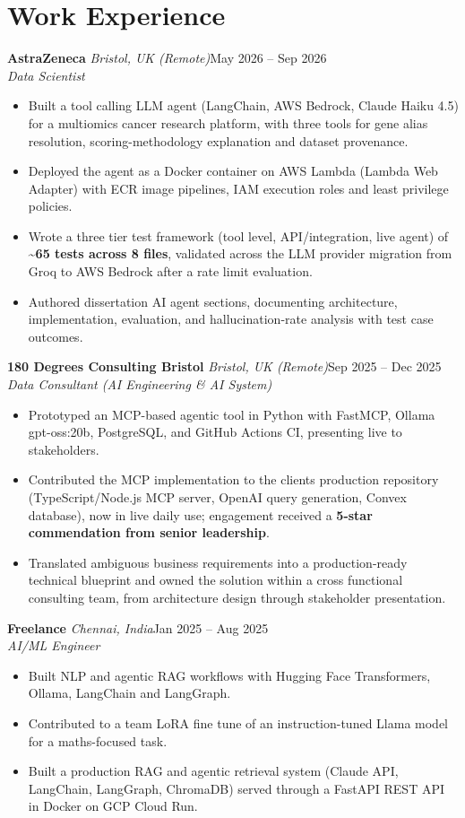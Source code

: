 \documentclass[a4paper,11pt]{article}
\newcommand{\role}[4]{%
  \textbf{#1}{\color{muted}\,\textperiodcentered\,\textit{#2}}\hfill{\color{muted}#3}\\
  \textit{#4}\par}
\newcommand{\gap}{\vspace{5pt}}
\newcommand{\num}[1]{\textbf{#1}}   %
\begin{document}
\section{Work Experience}
\role{AstraZeneca}{Bristol, UK (Remote)}{May 2026 – Sep 2026}{Data Scientist}
\begin{itemize}
  \item Built a tool calling LLM agent (LangChain, AWS Bedrock, Claude Haiku 4.5) for a multiomics cancer research platform, with three tools for gene alias resolution, scoring-methodology explanation and dataset provenance.
  \item Deployed the agent as a Docker container on AWS Lambda (Lambda Web Adapter) with ECR image pipelines, IAM execution roles and least privilege policies.
  \item Wrote a three tier test framework (tool level, API/integration, live agent) of \num{\textasciitilde{}65 tests across 8 files}, validated across the LLM provider migration from Groq to AWS Bedrock after a rate limit evaluation.
  \item Authored dissertation AI agent sections, documenting architecture, implementation, evaluation, and hallucination-rate analysis with test case outcomes.
\end{itemize}
\gap
{}
\role{180 Degrees Consulting Bristol}{Bristol, UK (Remote)}{Sep 2025 – Dec 2025}{Data Consultant (AI Engineering \& AI System)}
\begin{itemize}
  \item Prototyped an MCP-based agentic tool in Python with FastMCP, Ollama gpt-oss:20b, PostgreSQL, and GitHub Actions CI, presenting live to stakeholders.
  \item Contributed the MCP implementation to the client\textquotesingle{}s production repository (TypeScript/Node.js MCP server, OpenAI query generation, Convex database), now in live daily use; engagement received a \num{5-star commendation from senior leadership}.
  \item Translated ambiguous business requirements into a production-ready technical blueprint and owned the solution within a cross functional consulting team, from architecture design through stakeholder presentation.
\end{itemize}
\gap
{}
\role{Freelance}{Chennai, India}{Jan 2025 – Aug 2025}{AI/ML Engineer}
\begin{itemize}
  \item Built NLP and agentic RAG workflows with Hugging Face Transformers, Ollama, LangChain and LangGraph.
  \item Contributed to a team LoRA fine tune of an instruction-tuned Llama model for a maths-focused task.
  \item Built a production RAG and agentic retrieval system (Claude API, LangChain, LangGraph, ChromaDB) served through a FastAPI REST API in Docker on GCP Cloud Run.
\end{itemize}
\end{document}
